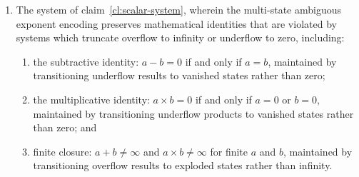 \documentclass[12pt,letter]{article}
\begin{document}
\begin{enumerate}
    \item The system of claim~\ref{cl:scalar-system}, wherein the multi-state ambiguous exponent encoding preserves mathematical identities that are violated by systems which truncate overflow to infinity or underflow to zero, including:
          \begin{enumerate}
              \item the subtractive identity: $a - b = 0$ if and only if $a = b$, maintained by transitioning underflow results to vanished states rather than zero;
              \item the multiplicative identity: $a \times b = 0$ if and only if $a = 0$ or $b = 0$, maintained by transitioning underflow products to vanished states rather than zero; and
              \item finite closure: $a + b \neq \infty$ and $a \times b \neq \infty$ for finite $a$ and $b$, maintained by transitioning overflow results to exploded states rather than infinity.
          \end{enumerate}


\end{enumerate}
\end{document}
